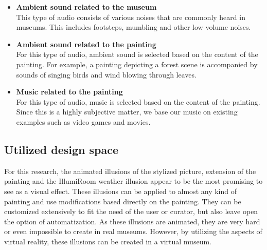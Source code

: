 \documentclass[a4paper]{article}
\begin{document}

\begin{itemize}

\item{\textbf{Ambient sound related to the museum}}
\\This type of audio consists of various noises that are commonly heard in museums. This includes footsteps, mumbling and other low volume noises. %

\item{\textbf{Ambient sound related to the painting}}
\\For this type of audio, ambient sound is selected based on the content of the painting. For example, a painting depicting a forest scene is accompanied by sounds of singing birds and wind blowing through leaves. %

\item{\textbf{Music related to the painting}}
\\For this type of audio, music is selected based on the content of the painting. Since this is a highly subjective matter, we base our music on existing examples such as video games and movies. %

\end{itemize}


\subsection{Utilized design space} \label{sec:utilized design space}

For this research, the animated illusions of the stylized picture, extension of the painting and the IllumiRoom weather illusion appear to be the most promising to see as a visual effect. These illusions can be applied to almost any kind of painting and use modifications based directly on the painting. They can be customized extensively to fit the need of the user or curator, but also leave open the option of automatization. As these illusions are animated, they are very hard or even impossible to create in real museums. However, by utilizing the aspects of virtual reality, these illusions can be created in a virtual museum.
\end{document}
